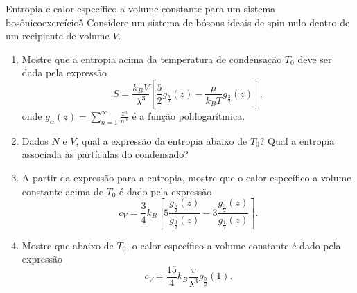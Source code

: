 \begin{exercício}{Entropia e calor específico a volume constante para um sistema bosônico}{exercício5}
    Considere um sistema de bósons ideais de spin nulo dentro de um recipiente de volume \(V\).
    \begin{enumerate}[label=(\alph*)]
        \item Mostre que a entropia acima da temperatura de condensação \(T_0\) deve ser dada pela expressão
            \begin{equation*}
                S = \frac{k_BV}{\lambda^3}\left[\frac52 g_{\frac52}(z) - \frac{\mu}{k_B T}g_{\frac32}(z)\right],
            \end{equation*}
            onde \(g_{\alpha}(z) = \sum_{n = 1}^\infty \frac{z^n}{n^\alpha}\) é a função polilogarítmica.
        \item Dados \(N\) e \(V\), qual a expressão da entropia abaixo de \(T_0?\) Qual a entropia associada às partículas do condensado?
        \item A partir da expressão para a entropia, mostre que o calor específico a volume constante acima de \(T_0\) é dado pela expressão
            \begin{equation*}
                c_V = \frac{3}{4} k_B \left[5 \frac{g_{\frac52}(z)}{g_{\frac32}(z)} - 3 \frac{g_{\frac32}(z)}{g_{\frac12}(z)}\right].
            \end{equation*}
        \item Mostre que abaixo de \(T_0\), o calor específico a volume constante é dado pela expressão
            \begin{equation*}
                c_V = \frac{15}{4} k_B \frac{v}{\lambda^3}g_{\frac52}(1).
            \end{equation*}
    \end{enumerate}
\end{exercício}
